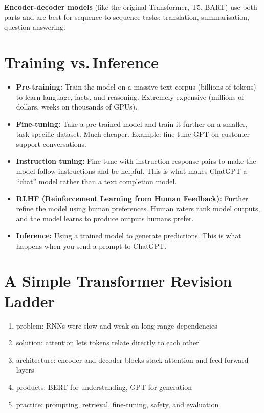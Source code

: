\documentclass[12pt, a4paper, oneside]{book}
\begin{document}
\begin{notebox}
\textbf{Encoder-decoder models} (like the original Transformer, T5, BART) use both parts and are best for sequence-to-sequence tasks: translation, summarisation, question answering.
\end{notebox}

\section{Training vs.\,Inference}

\begin{itemize}[leftmargin=2em]
    \item \textbf{Pre-training:} Train the model on a massive text corpus (billions of tokens) to learn language, facts, and reasoning. Extremely expensive (millions of dollars, weeks on thousands of GPUs).
    \item \textbf{Fine-tuning:} Take a pre-trained model and train it further on a smaller, task-specific dataset. Much cheaper. Example: fine-tune GPT on customer support conversations.
    \item \textbf{Instruction tuning:} Fine-tune with instruction-response pairs to make the model follow instructions and be helpful. This is what makes ChatGPT a ``chat'' model rather than a text completion model.
    \item \textbf{RLHF (Reinforcement Learning from Human Feedback):} Further refine the model using human preferences. Human raters rank model outputs, and the model learns to produce outputs humans prefer.
    \item \textbf{Inference:} Using a trained model to generate predictions. This is what happens when you send a prompt to ChatGPT.
\end{itemize}

\section{A Simple Transformer Revision Ladder}

\begin{enumerate}[leftmargin=2em]
    \item problem: RNNs were slow and weak on long-range dependencies
    \item solution: attention lets tokens relate directly to each other
    \item architecture: encoder and decoder blocks stack attention and feed-forward layers
    \item products: BERT for understanding, GPT for generation
    \item practice: prompting, retrieval, fine-tuning, safety, and evaluation
\end{enumerate}
\end{document}
